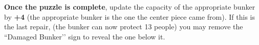 \documentclass[green]{GL2020}
\begin{document}
\textbf{Once the puzzle is complete}, update the capacity of the appropriate bunker by \textbf{+4} (the appropriate bunker is the one the center piece came from). If this is the last repair, (the bunker can now protect 13 people) you may remove the ``Damaged Bunker’’ sign to reveal the one below it.
\end{document}
